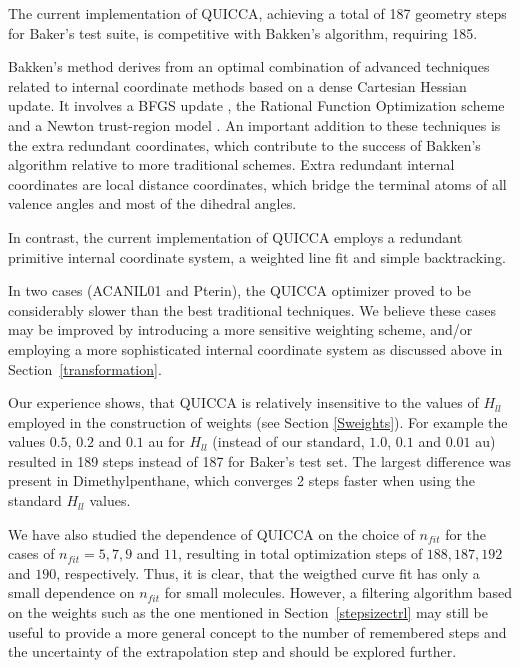\documentclass[prl,aps,preprint,superbib,12pt]{revtex4}
\begin{document}
The current implementation of QUICCA, achieving a total of 187 geometry steps for Baker's test suite, is 
competitive with Bakken's algorithm, requiring 185.  

Bakken's method \cite{VBakken02} derives from an optimal combination of advanced techniques
related to internal coordinate methods based on a dense Cartesian Hessian update. It involves 
a BFGS update \cite{RFletcher81}, the Rational Function Optimization scheme \cite{ABanerji85} 
and a Newton trust-region model \cite{RFletcher81}. An important addition to these techniques is the 
extra redundant coordinates, which contribute to the success of Bakken's algorithm relative to more 
traditional schemes. Extra redundant internal coordinates are local distance coordinates, which bridge 
the terminal atoms of all valence angles and most of the dihedral angles.

In contrast, the current implementation of QUICCA employs a redundant primitive internal coordinate 
system, a weighted line fit and simple backtracking.  

In two cases (ACANIL01 and Pterin), the QUICCA optimizer proved to be considerably slower 
than the best traditional techniques.   We believe these cases may be improved by introducing a
more sensitive weighting scheme, and/or employing a more sophisticated internal coordinate
system as discussed above in Section~\ref{transformation}.

Our experience shows, that QUICCA is relatively insensitive to the values of $H_{ll}$ employed 
in the construction of weights (see Section \ref{Sweights}).   For example the values $0.5$, $0.2$ 
and $0.1$ au for $H_{ll}$ (instead of our standard, $1.0$, $0.1$ and $0.01$ au)
resulted in 189 steps instead of 187 for Baker's test set.  The largest difference was present 
in Dimethylpenthane, which converges 2 steps faster when using the standard $H_{ll}$ values. 

We have also studied the dependence of QUICCA on the choice of $n_{fit}$
for the cases of $n_{fit}=5,7,9$ and $11$, resulting in total optimization
steps of $188, 187, 192$ and $190$, respectively. 
Thus, it is clear, that the weigthed curve fit has only a small
dependence on $n_{fit}$ for small molecules.
However, a filtering algorithm based on the weights such as 
the one mentioned in Section~\ref{stepsizectrl}
may still be useful to provide a more general concept to the 
number of remembered steps  and the uncertainty of the extrapolation 
step and should be explored further.
\end{document}
